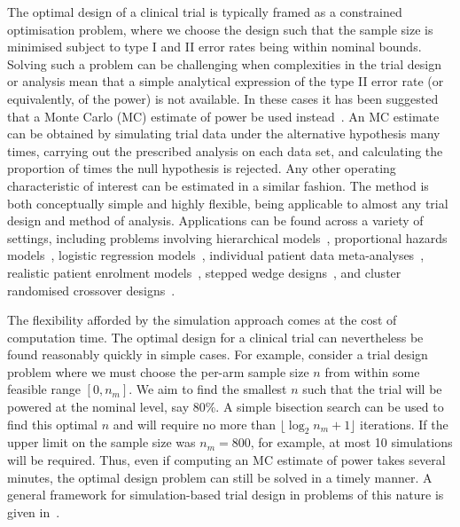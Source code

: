 \documentclass{article} %
\begin{document}


The optimal design of a clinical trial is typically framed as a constrained optimisation problem, where we choose the design such that the sample size is minimised subject to type I and II error rates being within nominal bounds. Solving such a problem can be challenging when complexities in the trial design or analysis mean that a simple analytical expression of the type II error rate (or equivalently, of the power) is not available. In these cases it has been suggested that a Monte Carlo (MC) estimate of power be used instead~\cite{Arnold2011, Landau2013}. An MC estimate can be obtained by simulating trial data under the alternative hypothesis many times, carrying out the prescribed analysis on each data set, and calculating the proportion of times the null hypothesis is rejected. Any other operating characteristic of interest can be estimated in a similar fashion.  The method is both conceptually simple and highly flexible, being applicable to almost any trial design and method of analysis. Applications can be found across a variety of settings, including problems involving hierarchical models~\cite{Feng1992, Hooper2013}, proportional hazards models~\cite{Schoenfeld2005}, logistic regression models~\cite{Grieve2016}, individual patient data meta-analyses~\cite{Sutton2007, Kontopantelis2016}, realistic patient enrolment models~\cite{Fedorov2005}, stepped wedge designs~\cite{Baio2015, Hooper2016}, and cluster randomised crossover designs~\cite{Reich2012}. 

The flexibility afforded by the simulation approach comes at the cost of computation time. The optimal design for a clinical trial can nevertheless be found reasonably quickly in simple cases. For example, consider a trial design problem where we must choose the per-arm sample size $n$ from within some feasible range $[0,  n_{m}]$. We aim to find the smallest $n$ such that the trial will be powered at the nominal level, say 80\%. A simple bisection search can be used to find this optimal $n$ and will require no more than 
$\lfloor \log_{2}{n_{m}}+1 \rfloor$ iterations. If the upper limit on the sample size was $n_{m} = 800$, for example, at most 10 simulations will be required. Thus, even if computing an MC estimate of power takes several minutes, the optimal design problem can still be solved in a timely manner. A general framework for simulation-based trial design in problems of this nature is given in~\cite{Landau2013}.
\end{document}
